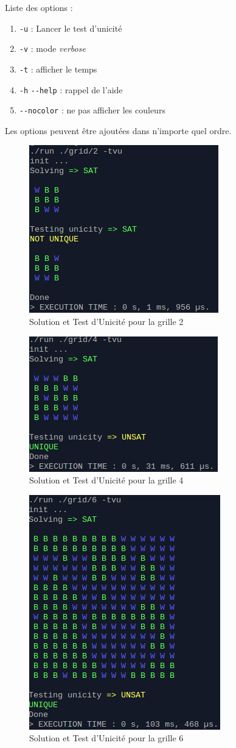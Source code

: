 \documentclass[a4paper,12pt]{report}
\begin{document}
Liste des options :
\begin{enumerate}
\item \verb+-u+ : Lancer le test d'unicité
\item \verb+-v+ : mode \textit{verbose}
\item \verb+-t+ : afficher le temps
\item \verb+-h+ \verb+--help+ : rappel de l'aide
\item  \verb+--nocolor+ : ne pas afficher les couleurs
\end{enumerate}
Les options peuvent être ajoutées dans n'importe quel ordre.

\begin{figure}[hbtp]
\centering
\includegraphics[scale=.6]{screen1.png}
\caption{Solution et Test d'Unicité pour la grille 2}
\end{figure}

\begin{figure}[hbtp]
\centering
\includegraphics[scale=.6]{screen2.png}
\caption{Solution et Test d'Unicité pour la grille 4}
\end{figure}

\begin{figure}[hbtp]
\centering
\includegraphics[scale=.6]{screen3.png}
\caption{Solution et Test d'Unicité pour la grille 6}
\end{figure}
\end{document}
